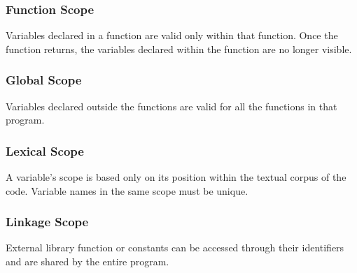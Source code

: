 \documentclass[a4paper]{article}
\begin{document}
\subsubsection{Function Scope}
Variables declared in a function are valid only within that function. Once the function returns, the variables declared within the function are no longer visible.

\subsubsection{Global Scope}
Variables declared outside the functions are valid for all the functions in that program.

\subsubsection{Lexical Scope}
A variable's scope is based only on its position within the textual corpus of the code. Variable names in the same scope must be unique.

\subsubsection{Linkage Scope}
External library function or constants can be accessed through their identifiers and are shared by the entire program.
\end{document}
